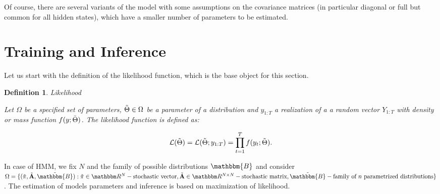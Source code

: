 \documentclass[shortabstract]{iithesis}
\newtheorem{definition}{Definition}
\begin{document}
Of course, there are several variants of the model with some assumptions on the covariance matrices (in particular diagonal or full but common for all hidden states), which have a smaller number of parameters to be estimated. 


\section{Training and Inference}  \label{sec:hmm_algs}

Let us start with the definition of the likelihood function, which is the base object for this section. 

\begin{definition}{Likelihood}

Let $\Omega$ be a specified set of parameters, $\Tilde{\Theta} \in \Omega$ be a parameter of a distribution and $y_{1:T}$ a realization of a a random vector $Y_{1:T}$ with density or mass function $f(y; \Tilde{\Theta})$. The likelihood function is defined as:

\begin{equation*}
    \mathcal{L}(\Tilde{\Theta}) = \mathcal{L}(\Tilde{\Theta}; y_{1:T}) = \prod_{t=1}^T f(y_t; \Tilde{\Theta})\text{.}
\end{equation*}

\end{definition}

In case of HMM, we fix $N$ and the family of possible distributions $\mathbbm{B}$ and consider $\Omega = \{(\Tilde{\pi}, \Tilde{\textbf{A}}, \Tilde{\mathbbm{B}}): \Tilde{\pi} \in \mathbbm R ^N - \text{stochastic vector}, \Tilde{\textbf{A}} \in \mathbbm R ^{N\times N} - \text{stochastic matrix}, \Tilde{\mathbbm{B}} - \text{family of $n$ parametrized distributions}\}$.
The estimation of models parameters and inference is based on maximization of likelihood.

\end{document}
